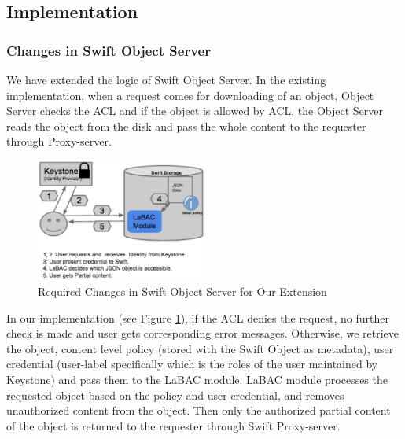 \subsection{Implementation}






\subsubsection{Changes in Swift Object Server}

 We have extended  the logic of Swift Object Server. In the existing implementation, when a request comes for downloading of an object, Object Server checks the ACL and if the object is allowed by ACL, the Object Server reads the object from the disk and pass the whole content to the requester through Proxy-server.

\begin{figure}
  \centering
    \includegraphics[width=0.5\textwidth]{CODASPY15/labac-implementation.eps}
 \caption{ Required Changes in Swift Object Server for Our Extension}
   \label{fig:implementation-in-swift}
\end{figure}
	
	In our implementation (see Figure \ref{fig:implementation-in-swift}), if the ACL denies the request, no further check is made and user gets corresponding error messages. Otherwise,  we retrieve the object, content level policy (stored with the Swift Object as metadata), user credential (user-label specifically which is the roles of the user maintained by Keystone) and pass them to the LaBAC module. LaBAC module processes the requested object based on the policy and user credential, and removes unauthorized content from the object. Then only the authorized partial content of the object is returned to the requester through Swift Proxy-server.
	
